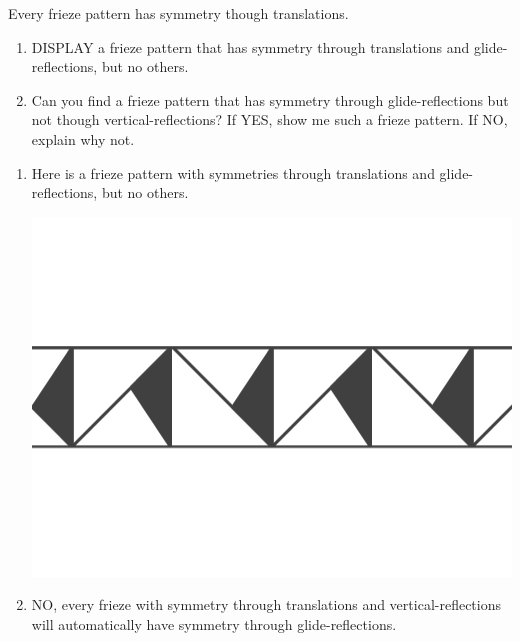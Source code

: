 \documentclass[noauthor,nooutcomes,12pt,hints,handout]{ximera}
\begin{document}
\begin{question}
  Every frieze pattern has symmetry though translations.
  \begin{enumerate}
    \item DISPLAY a frieze pattern that has symmetry through
      translations and glide-reflections, but no others.
    \item Can you find a frieze pattern that has symmetry through
    glide-reflections but not though vertical-reflections? If YES, show
    me such a frieze pattern. If NO, explain why not.
  \end{enumerate}
  \begin{freeResponse}
    \begin{enumerate}
      \item Here is a frieze pattern with symmetries through
        translations and glide-reflections, but no others.
        \begin{center}
          \includegraphics[width=.6\textwidth]{ansGR.png}
        \end{center}
      \item NO, every frieze with symmetry through translations and
        vertical-reflections will automatically have symmetry through
        glide-reflections.
    \end{enumerate}
  \end{freeResponse}
\end{question}
\mynewpage
\end{document}
